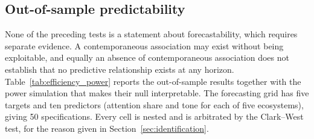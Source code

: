 \documentclass[12pt,a4paper]{article}
\begin{document}
\subsection{Out-of-sample predictability}
\label{sec:efficiency}

None of the preceding tests is a statement about forecastability, which requires separate evidence. A contemporaneous association may exist without being exploitable, and equally an absence of contemporaneous association does not establish that no predictive relationship exists at any horizon. Table~\ref{tab:efficiency_power} reports the out-of-sample results together with the power simulation that makes their null interpretable. The forecasting grid has five targets and ten predictors (attention share and tone for each of five ecosystems), giving 50 specifications. Every cell is nested and is arbitrated by the Clark--West test, for the reason given in Section~\ref{sec:identification}.
\end{document}
